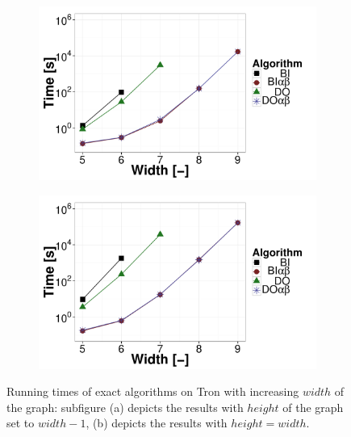 \begin{figure}
\centering
	\begin{subfigure}{0.49\textwidth}
		\includegraphics[width=1\textwidth]{figures/Tron-1.pdf}\caption{}\label{fig:off:res:tron1}
	\end{subfigure}
	\begin{subfigure}{0.49\textwidth}
		\includegraphics[width=1\textwidth]{figures/Tron-2.pdf}\caption{}\label{fig:off:res:tron2}
	\end{subfigure}
\caption{Running times of exact algorithms on Tron with increasing $width$ of the graph: subfigure (a) depicts the results with $height$ of the graph set to $width - 1$, (b) depicts the results with $height = width$.} \label{fig:off:res:tron}
\end{figure}

